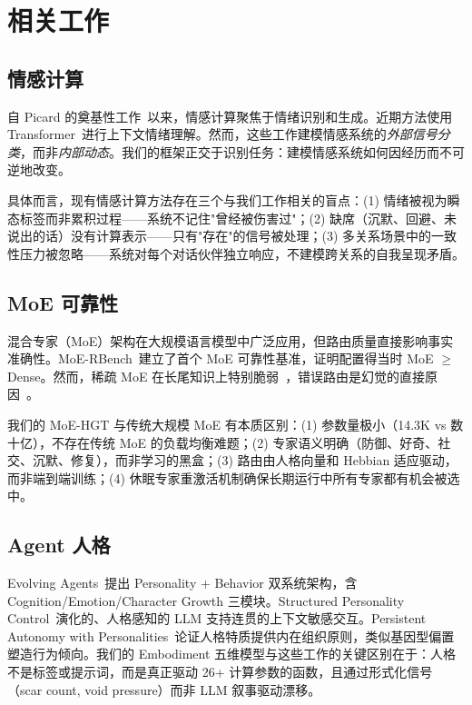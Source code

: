 \documentclass[11pt]{article}
\begin{document}
\section{相关工作}
\label{sec:related}

\subsection{情感计算}

自 Picard 的奠基性工作~\cite{picard1997}以来，情感计算聚焦于情绪识别和生成。近期方法使用 Transformer~\cite{vaswani2017}进行上下文情绪理解。然而，这些工作建模情感系统的\emph{外部信号分类}，而非\emph{内部动态}。我们的框架正交于识别任务：建模情感系统如何因经历而不可逆地改变。

具体而言，现有情感计算方法存在三个与我们工作相关的盲点：(1) 情绪被视为瞬态标签而非累积过程——系统不记住"曾经被伤害过"；(2) 缺席（沉默、回避、未说出的话）没有计算表示——只有"存在"的信号被处理；(3) 多关系场景中的一致性压力被忽略——系统对每个对话伙伴独立响应，不建模跨关系的自我呈现矛盾。

\subsection{MoE 可靠性}

混合专家（MoE）架构在大规模语言模型中广泛应用，但路由质量直接影响事实准确性。MoE-RBench~\cite{moerbench2024}建立了首个 MoE 可靠性基准，证明配置得当时 MoE $\geq$ Dense。然而，稀疏 MoE 在长尾知识上特别脆弱~\cite{counterfactual2025}，错误路由是幻觉的直接原因~\cite{misrouted2025}。

我们的 MoE-HGT 与传统大规模 MoE 有本质区别：(1) 参数量极小（14.3K vs 数十亿），不存在传统 MoE 的负载均衡难题；(2) 专家语义明确（防御、好奇、社交、沉默、修复），而非学习的黑盒；(3) 路由由人格向量和 Hebbian 适应驱动，而非端到端训练；(4) 休眠专家重激活机制确保长期运行中所有专家都有机会被选中。

\subsection{Agent 人格}

Evolving Agents~\cite{evolving2024}提出 Personality + Behavior 双系统架构，含 Cognition/Emotion/Character Growth 三模块。Structured Personality Control~\cite{structured2025}演化的、人格感知的 LLM 支持连贯的上下文敏感交互。Persistent Autonomy with Personalities~\cite{persistent2026}论证人格特质提供内在组织原则，类似基因型偏置塑造行为倾向。我们的 Embodiment 五维模型与这些工作的关键区别在于：人格不是标签或提示词，而是真正驱动 26+ 计算参数的函数，且通过形式化信号（scar count, void pressure）而非 LLM 叙事驱动漂移。
\end{document}
